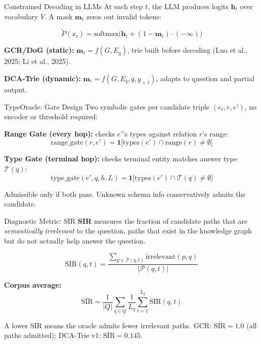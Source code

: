 \documentclass{beamer}
\begin{document}
\begin{frame}{Constrained Decoding in LLMs}
  At each step $t$, the LLM produces logits $\mathbf{h}_t$ over vocabulary $V$. A mask $\mathbf{m}_t$ zeros out invalid tokens:

  \[
    \tilde{P}(x_t) = \text{softmax}\!\bigl(\mathbf{h}_t + (1 - \mathbf{m}_t) \cdot (-\infty)\bigr)
  \]

  \vspace{0.5em}
  \textbf{GCR/DoG (static):} $\mathbf{m}_t = f(G, E_q)$, trie built before decoding (Luo et al., 2025; Li et al., 2025).

  \vspace{0.3em}
  \textbf{DCA-Trie (dynamic):} $\mathbf{m}_t = f(G, E_q, q, y_{<t})$, adapts to question and partial output.
\end{frame}

\begin{frame}{TypeOracle: Gate Design}
  Two symbolic gates per candidate triple $(e_t, r, e')$, no encoder or threshold required:

  \vspace{0.5em}
  \textbf{Range Gate (every hop):} checks $e'$'s types against relation $r$'s range:
  \[
    \text{range\_gate}(r, e') = \mathbf{1}\!\bigl[\text{types}(e') \cap \text{range}(r) \neq \emptyset\bigr]
  \]

  \vspace{0.5em}
  \textbf{Type Gate (terminal hop):} checks terminal entity matches answer type $\mathcal{T}(q)$:
  \[
    \text{type\_gate}(e', q, h, L) = \mathbf{1}\!\bigl[\text{types}(e') \cap \mathcal{T}(q) \neq \emptyset\bigr]
  \]

  \vspace{0.5em}
  Admissible only if both pass. Unknown schema info conservatively admits the candidate.
\end{frame}

\begin{frame}{Diagnostic Metric: SIR}
  \textbf{SIR} measures the fraction of candidate paths that are \emph{semantically irrelevant} to the question, paths that exist in the knowledge graph but do not actually help answer the question.

  \[
    \text{SIR}(q, t) = \frac{\sum_{p \in \mathcal{P}(q, t)} \text{irrelevant}(p, q)}{|\mathcal{P}(q, t)|}
  \]

  \vspace{0.5em}
  \textbf{Corpus average:}
  \[
    \overline{\text{SIR}} = \frac{1}{|Q|} \sum_{q \in Q} \frac{1}{L_q} \sum_{t=1}^{L_q} \text{SIR}(q, t)
  \]

  \vspace{0.5em}
  A lower SIR means the oracle admits fewer irrelevant paths. GCR: $\overline{\text{SIR}} = 1.0$ (all paths admitted); DCA-Trie v1: $\overline{\text{SIR}} = 0.145$.
\end{frame}
\end{document}
